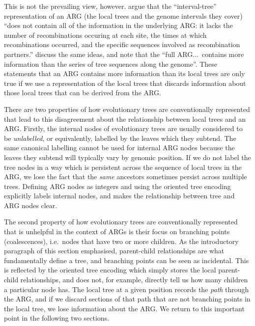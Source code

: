 \documentclass{article}
\begin{document}
This is not the prevailing view, however.
\cite{kuhner2017consensus} argue that the
``interval-tree'' representation of
an ARG (the local trees and the genome intervals they cover)
``does not contain all of the information in the underlying ARG: it lacks the
number of recombinations occuring at each site, the times at which
recombinations occurred, and the specific sequences involved as recombination
partners.''
\cite{shipilina2023origin} discuss the same ideas,
and note that the
``full ARG...~contains more information than the series of tree
sequences along the genome''.
These statements that an ARG
contains more information than its local trees are only true
if we use a representation of the local trees that discards
information about those local trees that can be derived from the ARG.

There are two properties of how evolutionary trees are conventionally
represented that lead to this
disagreement about the relationship between local trees and an ARG.
Firstly, the internal nodes of evolutionary trees are usually
considered to be \emph{unlabelled}, or equivalently, labelled by the leaves which they subtend.
The same canonical labelling cannot be used for internal ARG nodes because the leaves they subtend will typically vary by genomic position. If we do not label the tree nodes in a way which is persistent across the sequence of local trees in the ARG, we lose the fact that
the \emph{same} ancestors sometimes persist across multiple trees.
Defining ARG nodes as integers and using the oriented tree encoding
explicitly labels internal nodes, and makes the relationship between
tree and ARG nodes clear.

The second property of how evolutionary trees
are conventionally represented that is unhelpful in the context of ARGs is their
focus on branching points (coalescences), i.e.\
nodes that have two or more children.
As the introductory paragraph of this section emphasised,
parent-child relationships are what fundamentally define a tree,
and branching points can be seen as incidental. This is reflected
by the oriented tree encoding which simply stores the local
parent-child relationships, and does not, for example,
directly tell us how many children a particular node has.
The local tree at a given position records the \emph{path} through
the ARG, and if we discard sections of that path that are not
branching points in the local tree, we lose information about the ARG.
We return to this important point in the following two sections.
\end{document}
